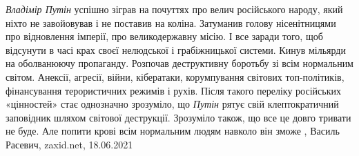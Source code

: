 \emph{Владімір Путін} успішно зіграв на почуттях про велич російського народу, який
ніхто не завойовував і не поставив на коліна. Затуманив голову нісенітницями
про відновлення імперії, про великодержавну місію. І все заради того, щоб
відсунути в часі крах своєї нелюдської і грабіжницької системи. Кинув мільярди
на оболванюючу пропаганду. Розпочав деструктивну боротьбу зі всім нормальним
світом. Анексії, агресії, війни, кібератаки, корумпування світових
топ-політиків, фінансування терористичних режимів і рухів. Після такого
переліку російських «цінностей» стає однозначно зрозуміло, що \emph{Путін} рятує свій
клептократичний заповідник шляхом світової деструкції. Зрозуміло також, що все
це довго тривати не буде. Але попити крові всім нормальним людям навколо він
зможе
, 
Василь Расевич, zaxid.net, 18.06.2021

